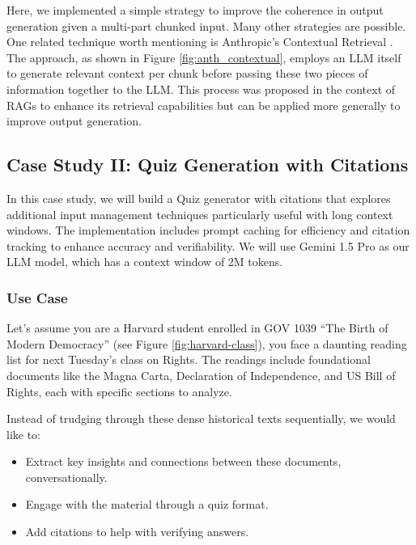 Here, we implemented a simple strategy to improve the coherence in output generation given a multi-part chunked input. Many other strategies are possible. One related technique worth mentioning is Anthropic's Contextual Retrieval . The approach, as shown in Figure \ref{fig:anth_contextual}, employs an LLM itself to generate relevant context per chunk before passing these two pieces of information together to the LLM. This process was proposed in the context of RAGs to enhance its retrieval capabilities but can be applied more generally to improve output generation.

\subsection{Case Study II: Quiz Generation with Citations}

In this case study, we will build a Quiz generator with citations that explores additional input management techniques particularly useful with long context windows. The implementation includes prompt caching for efficiency and citation tracking to enhance accuracy and verifiability. We will use Gemini 1.5 Pro as our LLM model, which has a context window of 2M tokens.

\subsubsection{Use Case}

Let's assume you are a Harvard student enrolled in GOV 1039 ``The Birth of Modern Democracy'' (see Figure \ref{fig:harvard-class}), you face a daunting reading list for next Tuesday's class on Rights. The readings include foundational documents like the Magna Carta, Declaration of Independence, and US Bill of Rights, each with specific sections to analyze.


Instead of trudging through these dense historical texts sequentially, we would like to:
\begin{itemize}
\item Extract key insights and connections between these documents, conversationally.
\item Engage with the material through a quiz format.
\item Add citations to help with verifying answers.
\end{itemize}

